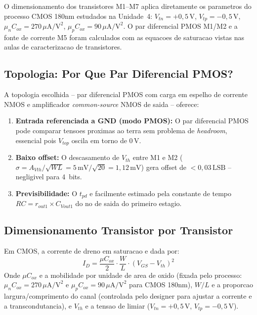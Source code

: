 \documentclass[12pt, a4paper]{article}
\begin{document}
\begin{unidadebox}
O dimensionamento dos transistores M1--M7 aplica diretamente os parametros do processo
CMOS 180nm estudados na Unidade~4: $V_{tn}=+0{,}5\,\text{V}$, $V_{tp}=-0{,}5\,\text{V}$,
$\mu_n C_{ox}=270\,\mu\text{A/V}^2$, $\mu_p C_{ox}=90\,\mu\text{A/V}^2$. O par diferencial
PMOS M1/M2 e a fonte de corrente M5 foram calculados com as equacoes de saturacao vistas nas
aulas de caracterizacao de transistores.
\end{unidadebox}

\subsection{Topologia: Por Que Par Diferencial PMOS?}

A topologia escolhida -- par diferencial PMOS com carga em espelho de corrente NMOS e
amplificador \textit{common-source} NMOS de saida -- oferece:

\begin{enumerate}
  \item \textbf{Entrada referenciada a GND (modo PMOS):} O par diferencial PMOS pode comparar
        tensoes proximas ao terra sem problema de \textit{headroom}, essencial pois $V_{top}$
        oscila em torno de $0\,\text{V}$.
  \item \textbf{Baixo offset:} O descasamento de $V_{th}$ entre M1 e M2 ($\sigma =
        A_{Vth}/\sqrt{WL} = 5\,\text{mV}/\sqrt{20} = 1{,}12\,\text{mV}$) gera offset
        de $< 0{,}03\,\text{LSB}$ -- negligivel para 4~bits.
  \item \textbf{Previsibilidade:} O $t_{pd}$ e facilmente estimado pela constante de tempo
        $RC = r_{out1} \times C_{Vout1}$ do no de saida do primeiro estagio.
\end{enumerate}

\subsection{Dimensionamento Transistor por Transistor}

\begin{conceitobox}
Em CMOS, a corrente de dreno em saturacao e dada por:
\[ I_D = \frac{\mu C_{ox}}{2} \cdot \frac{W}{L} \cdot (V_{GS} - V_{th})^2 \]
Onde $\mu C_{ox}$ e a mobilidade por unidade de area de oxido (fixada pelo processo:
$\mu_n C_{ox} = 270\,\mu\text{A/V}^2$ e $\mu_p C_{ox} = 90\,\mu\text{A/V}^2$ para
CMOS 180nm), $W/L$ e a proporcao largura/comprimento do canal (controlada pelo designer
para ajustar a corrente e a transcondutancia), e $V_{th}$ e a tensao de limiar
($V_{tn}=+0{,}5\,\text{V}$, $V_{tp}=-0{,}5\,\text{V}$).
\end{conceitobox}
\end{document}
